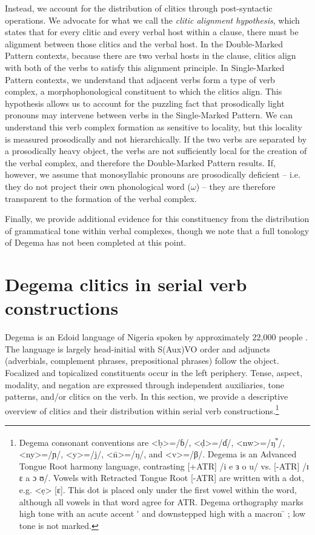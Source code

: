 \documentclass[output=paper]{langsci/langscibook}
\begin{document}
Instead, we account for the distribution of clitics through post-syntactic operations. We advocate for what we call the \textit{clitic alignment hypothesis}, which states that for every clitic and every verbal host within a clause, there must be alignment between those clitics and the verbal host. In the Double-Marked Pattern contexts, because there are two verbal hosts in the clause, clitics align with both of the verbs to satisfy this alignment principle. In Single-Marked Pattern contexts, we understand that adjacent verbs form a type of verb complex, a morphophonological constituent to which the clitics align. This hypothesis allows us to account for the puzzling fact that prosodically light pronouns may intervene between verbs in the Single-Marked Pattern. We can understand this verb complex formation as sensitive to locality, but this locality is measured prosodically and not hierarchically. If the two verbs are separated by a prosodically heavy object, the verbs are not sufficiently local for the creation of the verbal complex, and therefore the Double-Marked Pattern results. If, however, we assume that monosyllabic pronouns are prosodically deficient – i.e. they do not project their own phonological word ($\omega $) – they are therefore transparent to the formation of the verbal complex. 

Finally, we provide additional evidence for this constituency from the distribution of grammatical tone within verbal complexes, though we note that a full tonology of Degema has not been completed at this point. 

\section{Degema clitics in serial verb constructions}

Degema is an Edoid language of Nigeria spoken by approximately 22,000 people \citep[5]{Kari2004}. The language is largely head-initial with S(Aux)VO order and adjuncts (adverbials, complement phrases, prepositional phrases) follow the object. Focalized and topicalized constituents occur in the left periphery. Tense, aspect, modality, and negation are expressed through independent auxiliaries, tone patterns, and/or clitics on the verb. In this section, we provide a descriptive overview of clitics and their distribution within serial verb constructions.\footnote{Degema consonant conventions are <ḅ>=/ɓ/, <ḍ>=/ɗ/, <nw>=/ŋ\textsuperscript{ʷ}/, <ny>=/ɲ/, <y>=/j/, <\={n}>=/ŋ/, and <v>=/β/. Degema is an Advanced Tongue Root harmony language, contrasting [+ATR] /i e ɜ o u/ vs. [-ATR] /ɪ ɛ a ɔ ʊ/. Vowels with Retracted Tongue Root [-ATR] are written with a dot, e.g. <ẹ> [ɛ]. This dot is placed only under the first vowel within the word, although all vowels in that word agree for ATR. Degema orthography marks high tone with an acute accent  \'{}  and downstepped high with a macron  \={}  ; low tone is not marked.
} 
\end{document}
